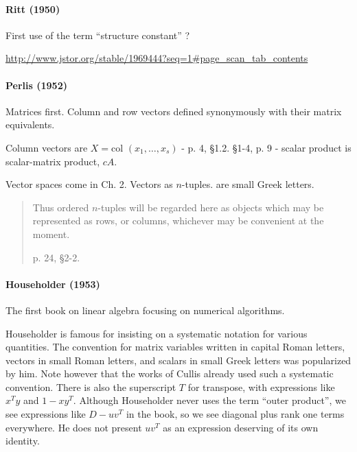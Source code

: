 \paragraph{Ritt (1950)~\cite{Ritt1950}}

First use of the term ``structure constant'' ?

\url{http://www.jstor.org/stable/1969444?seq=1#page_scan_tab_contents}


\paragraph{Perlis (1952)~\cite{Perlis1952}}

Matrices first. Column and row vectors defined synonymously with their matrix equivalents.

Column vectors are $X = \textrm{col }(x_1, \dots, x_s)$ - p. 4, \S 1.2.
\S 1-4, p. 9 - scalar product is scalar-matrix product, $c A$.

Vector spaces come in Ch. 2. Vectors as $n$-tuples. are small Greek letters.

\begin{quote}
Thus ordered $n$-tuples will be regarded here as objects which may be represented as rows, or columns, whichever may be convenient at the moment.

p. 24, \S2-2.
\end{quote}


\paragraph{Householder (1953)~\cite{Householder1953}}

The first book on linear algebra focusing on numerical algorithms.

Householder is famous for insisting on a systematic notation for various quantities.
The convention for matrix variables written in capital Roman letters, vectors in small Roman letters, and scalars in small Greek letters was popularized by him. Note however that the works of Cullis already used such a systematic convention.
There is also the superscript $T$ for transpose, with expressions like $x^T y$ and $1 - x y^T$.
Although Householder never uses the term ``outer product'', we see expressions like $D - u v^T$ in the book, so we see diagonal plus rank one terms everywhere. He does not present $u v^T$ as an expression deserving of its own identity.

